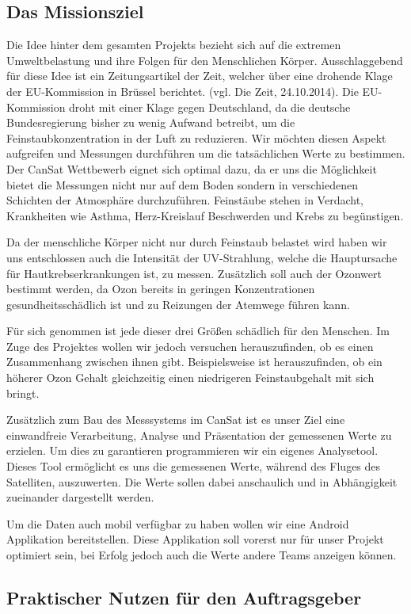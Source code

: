 \subsection{Das Missionsziel}
Die Idee hinter dem gesamten Projekts bezieht sich auf die extremen Umweltbelastung und ihre Folgen für den Menschlichen Körper. Ausschlaggebend für diese Idee ist ein Zeitungsartikel der Zeit, welcher über eine drohende Klage der EU-Kommission in Brüssel berichtet. (vgl. Die Zeit, 24.10.2014). Die EU-Kommission droht mit einer Klage gegen Deutschland, da die deutsche Bundesregierung bisher zu wenig Aufwand betreibt, um die Feinstaubkonzentration in der Luft zu reduzieren. Wir möchten diesen Aspekt aufgreifen und Messungen durchführen um die tatsächlichen Werte zu bestimmen. Der CanSat Wettbewerb eignet sich optimal dazu, da er uns die Möglichkeit bietet die Messungen nicht nur auf dem Boden sondern in verschiedenen Schichten der Atmosphäre durchzuführen. Feinstäube stehen in Verdacht, Krankheiten wie Asthma, Herz-Kreislauf Beschwerden und Krebs zu begünstigen.

Da der menschliche Körper nicht nur durch Feinstaub belastet wird haben wir uns entschlossen auch die Intensität der UV-Strahlung, welche die Hauptursache für Hautkrebserkrankungen ist, zu messen. Zusätzlich soll auch der Ozonwert bestimmt werden, da Ozon bereits in geringen Konzentrationen gesundheitsschädlich ist und zu Reizungen der Atemwege führen kann.

Für sich genommen ist jede dieser drei Größen schädlich für den Menschen. Im Zuge des Projektes wollen wir jedoch versuchen herauszufinden, ob es einen Zusammenhang zwischen ihnen gibt. Beispielsweise ist herauszufinden, ob ein höherer Ozon Gehalt gleichzeitig einen niedrigeren Feinstaubgehalt mit sich bringt.

Zusätzlich zum Bau des Messsystems im CanSat ist es unser Ziel eine einwandfreie Verarbeitung, Analyse und Präsentation der gemessenen Werte zu erzielen. Um dies zu garantieren programmieren wir ein eigenes Analysetool. Dieses Tool ermöglicht es uns die gemessenen Werte, während des Fluges des Satelliten, auszuwerten. Die Werte sollen dabei anschaulich und in Abhängigkeit zueinander dargestellt werden.

Um die Daten auch mobil verfügbar zu haben wollen wir eine Android Applikation bereitstellen. Diese Applikation soll vorerst nur für unser Projekt optimiert sein, bei Erfolg jedoch auch die Werte andere Teams anzeigen können.

\subsection{Praktischer Nutzen für den Auftragsgeber}



